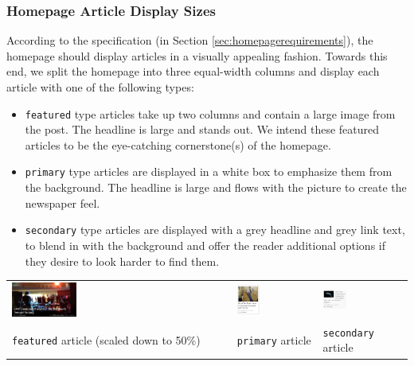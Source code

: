 \documentclass[11pt,letterpaper,titlepage]{article}
\begin{document}
\subsubsection{Homepage Article Display Sizes}
According to the specification (in Section \ref{sec:homepagerequirements}), the homepage should display articles in a visually appealing fashion.
Towards this end, we split the homepage into three equal-width columns and display each article with one of the following types:

\begin{itemize}
\item \verb+featured+ type articles take up two columns and contain a large image from the post. The headline is large and stands out. We intend these featured articles to be the eye-catching cornerstone(s) of the homepage.
\item \verb+primary+ type articles are displayed in a white box to emphasize them from the background. The headline is large and flows with the picture to create the newspaper feel.
\item \verb+secondary+ type articles are displayed with a grey headline and grey link text, to blend in with the background and offer the reader additional options if they desire to look harder to find them.
\end{itemize}

\begin{tabular}{ m{} m{} m{} }
\includegraphics[width=0.3\textwidth]{img/featured-image.png} &
\includegraphics[width=0.3\textwidth]{img/primary-image.png} &
\includegraphics[width=0.3\textwidth]{img/secondary-image.png} \\
\centering\verb+featured+ article (scaled down to 50\%) & \centering\verb+primary+ article & \centering\verb+secondary+ article
\end{tabular}
\vspace{1.2em}
\end{document}
